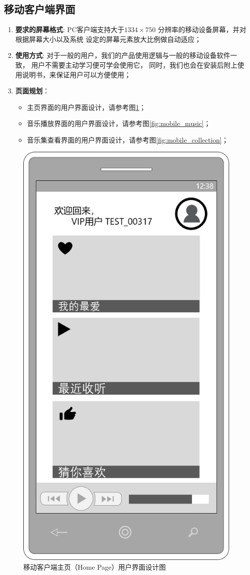 \subsection{移动客户端界面} %
\label{sub:移动客户端界面}
\begin{enumerate}
	\item \textbf{要求的屏幕格式}:
		PC客户端支持大于$1334 \times 750$ 分辨率的移动设备屏幕，并对根据屏幕大小以及系统
		设定的屏幕元素放大比例做自动适应；
	\item \textbf{使用方式}:
		对于一般的用户，我们的产品使用逻辑与一般的移动设备软件一致，
			用户不需要主动学习便可学会使用它，
		同时，我们也会在安装后附上使用说明书，来保证用户可以方便使用；
	\item \textbf{页面规划}： 
	\begin{itemize}
		\item 主页界面的用户界面设计，请参考图\ref{fig:mobile_home}；
		\item 音乐播放界面的用户界面设计，请参考图\ref{fig:mobile_music}；
		\item 音乐集查看界面的用户界面设计，请参考图\ref{fig:mobile_collection}；
	\end{itemize}
\end{enumerate}

\begin{figure}[h!]
  \centering

  \includegraphics[width=.33\linewidth]{figures/mobile_home}

  \caption{  \label{fig:mobile_home}
  		移动客户端主页（Home Page）用户界面设计图
    }
\end{figure}

